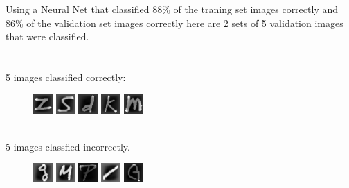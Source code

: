 \documentclass[12pt]{article}
\newenvironment{problem}[2][Problem]{\begin{trivlist}
\item[\hskip \labelsep {\bfseries #1}\hskip \labelsep {\bfseries #2.}]}{\end{trivlist}}
\begin{document}
\begin{problem}{3: Visualization}
Using a Neural Net that classified 88\% of the traning set images correctly and 86\% of the validation set images correctly here are 2 sets of 5 validation images that were classified.\\\\\\
5 images classified correctly:
\begin{figure}[h]
\includegraphics[totalheight=2cm]{images/correct0.png}
\includegraphics[totalheight=2cm]{images/correct1.png}
\includegraphics[totalheight=2cm]{images/correct2.png}
\includegraphics[totalheight=2cm]{images/correct3.png}
\includegraphics[totalheight=2cm]{images/correct4.png}
\end{figure}
\\5 images classfied incorrectly.
\begin{figure}[h]
\includegraphics[totalheight=2cm]{images/incorrect0.png}
\includegraphics[totalheight=2cm]{images/incorrect1.png}
\includegraphics[totalheight=2cm]{images/incorrect2.png}
\includegraphics[totalheight=2cm]{images/incorrect3.png}
\includegraphics[totalheight=2cm]{images/incorrect4.png}
\end{figure}
\end{problem}
\end{document}
